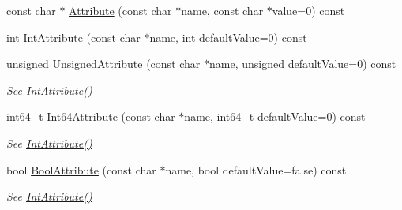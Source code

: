 \begin{DoxyCompactItemize}
\item 
const char $\ast$ \mbox{\hyperlink{classtinyxml2_1_1_x_m_l_element_a48cf4a315cfbac7d74cd0d5ff2c5df51}{Attribute}} (const char $\ast$name, const char $\ast$value=0) const
\item 
int \mbox{\hyperlink{classtinyxml2_1_1_x_m_l_element_a95a89b13bb14a2d4655e2b5b406c00d4}{Int\+Attribute}} (const char $\ast$name, int default\+Value=0) const
\item 
\mbox{\label{classtinyxml2_1_1_x_m_l_element_afea43a1d4aa33e3703ddee5fc9adc26c}} 
unsigned \mbox{\hyperlink{classtinyxml2_1_1_x_m_l_element_afea43a1d4aa33e3703ddee5fc9adc26c}{Unsigned\+Attribute}} (const char $\ast$name, unsigned default\+Value=0) const
\begin{DoxyCompactList}\small\item\em See \mbox{\hyperlink{classtinyxml2_1_1_x_m_l_element_a95a89b13bb14a2d4655e2b5b406c00d4}{Int\+Attribute()}} \end{DoxyCompactList}\item 
\mbox{\label{classtinyxml2_1_1_x_m_l_element_a66d96972adecd816194191f13cc4a0a0}} 
int64\+\_\+t \mbox{\hyperlink{classtinyxml2_1_1_x_m_l_element_a66d96972adecd816194191f13cc4a0a0}{Int64\+Attribute}} (const char $\ast$name, int64\+\_\+t default\+Value=0) const
\begin{DoxyCompactList}\small\item\em See \mbox{\hyperlink{classtinyxml2_1_1_x_m_l_element_a95a89b13bb14a2d4655e2b5b406c00d4}{Int\+Attribute()}} \end{DoxyCompactList}\item 
\mbox{\label{classtinyxml2_1_1_x_m_l_element_a53eda26131e1ad1031ef8ec8adb51bd8}} 
bool \mbox{\hyperlink{classtinyxml2_1_1_x_m_l_element_a53eda26131e1ad1031ef8ec8adb51bd8}{Bool\+Attribute}} (const char $\ast$name, bool default\+Value=false) const
\begin{DoxyCompactList}\small\item\em See \mbox{\hyperlink{classtinyxml2_1_1_x_m_l_element_a95a89b13bb14a2d4655e2b5b406c00d4}{Int\+Attribute()}} \end{DoxyCompactList}\item 
\mbox{\label{classtinyxml2_1_1_x_m_l_element_a10a90c505aea716bf073eea1c97f33b5}} 

\end{DoxyCompactItemize}
